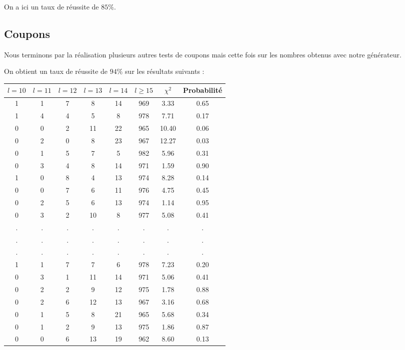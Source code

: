 \documentclass[12pt,a4paper]{article}
\begin{document}
On a ici un taux de réussite de $85\%$.

\newpage
\subsection{Coupons}

Nous terminons par la réalisation plusieurs autres tests de coupons mais
cette fois sur les nombres obtenus avec notre générateur.

On obtient un taux de réussite de $94\%$ sur les résultats suivants :

\begin{center}
\begin{tabular}{|c|c|c|c|c|c|c|c|}
\hline
$l = 10$ & $l = 11$ & $l = 12$ & $l = 13$ & $l = 14$ & $l \geq 15$ & $\chi^2$ & Probabilité \\ \hline
1 & 1 & 7 & 8 & 14 & 969 &  3.33 &  0.65\\ \hline
1 & 4 & 4 & 5 & 8 & 978 &  7.71 &  0.17\\ \hline
0 & 0 & 2 & 11 & 22 & 965 & 10.40 &  0.06\\ \hline
0 & 2 & 0 & 8 & 23 & 967 & 12.27 &  0.03\\ \hline
0 & 1 & 5 & 7 & 5 & 982 &  5.96 &  0.31\\ \hline
0 & 3 & 4 & 8 & 14 & 971 &  1.59 &  0.90\\ \hline
1 & 0 & 8 & 4 & 13 & 974 &  8.28 &  0.14\\ \hline
0 & 0 & 7 & 6 & 11 & 976 &  4.75 &  0.45\\ \hline
0 & 2 & 5 & 6 & 13 & 974 &  1.14 &  0.95\\ \hline
0 & 3 & 2 & 10 & 8 & 977 &  5.08 &  0.41\\ \hline
 . & . & . & . & . & . & . & .\\ \hline
 . & . & . & . & . & . & . & .\\ \hline
 . & . & . & . & . & . & . & .\\ \hline
1 & 1 & 7 & 7 & 6 & 978 &  7.23 &  0.20\\ \hline
0 & 3 & 1 & 11 & 14 & 971 &  5.06 &  0.41\\ \hline
0 & 2 & 2 & 9 & 12 & 975 &  1.78 &  0.88\\ \hline
0 & 2 & 6 & 12 & 13 & 967 &  3.16 &  0.68\\ \hline
0 & 1 & 5 & 8 & 21 & 965 &  5.68 &  0.34\\ \hline
0 & 1 & 2 & 9 & 13 & 975 &  1.86 &  0.87\\ \hline
0 & 0 & 6 & 13 & 19 & 962 &  8.60 &  0.13\\ \hline

\end{tabular}
\end{center}
\end{document}
